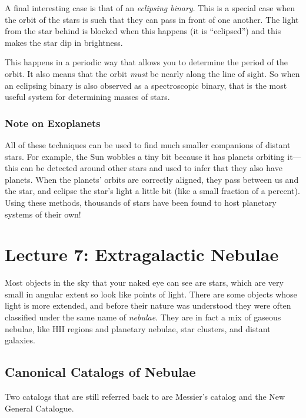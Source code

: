 \documentclass[12pt, preprint]{aastex}
\begin{document}
A final interesting case is that of an {\it eclipsing binary}. This is
a special case when the orbit of the stars is such that they can pass
in front of one another. The light from the star behind is blocked
when this happens (it is ``eclipsed'') and this makes the star dip in
brightness.

This happens in a periodic way that allows you to determine the period
of the orbit. It also means that the orbit {\it must} be nearly along
the line of sight. So when an eclipsing binary is also observed as a
spectroscopic binary, that is the most useful system for determining
masses of stars.

\subsubsection{Note on Exoplanets}

All of these techniques can be used to find much smaller companions of
distant stars. For example, the Sun wobbles a tiny bit because it has
planets orbiting it---this can be detected around other stars and used
to infer that they also have planets. When the planets' orbits are
correctly aligned, they pass between us and the star, and eclipse the
star's light a little bit (like a small fraction of a percent). Using
these methods, thousands of stars have been found to host planetary
systems of their own!

\clearpage
\section{Lecture 7: Extragalactic Nebulae}

Most objects in the sky that your naked eye can see are stars, which
are very small in angular extent so look like points of light. There
are some objects whose light is more extended, and before their nature
was understood they were often classified under the same name of {\it
  nebulae}. They are in fact a mix of gaseous nebulae, like HII
regions and planetary nebulae, star clusters, and distant galaxies.

\subsection{Canonical Catalogs of Nebulae}

Two catalogs that are still referred back to are Messier's catalog and
the New General Catalogue.
\end{document}

